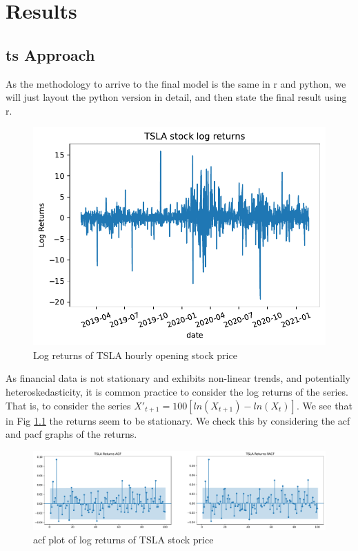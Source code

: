 \chapter{Results}
\label{chap:results}

\section{\acrlong{ts} Approach}
As the methodology to arrive to the final model is the same in \Gls{r} and \Gls{python}, we will just layout the \Gls{python} version in detail, and then state the final result using \Gls{r}.

\begin{figure}
	\centering
	\includegraphics[width=\textwidth]{img/img_returns.pdf}
	\caption{Log returns of TSLA hourly opening stock price}
	\label{fig:tsla_returns}
\end{figure}

As financial data is not stationary and exhibits non-linear trends, and potentially heteroskedasticity, it is common practice to consider the log returns of the series. That is, to consider the series $X'_{t+1} = 100[ln(X_{t+1})-ln(X_t)]$. We see that in Fig \ref{fig:tsla_returns} the returns seem to be stationary. We check this by considering the \acrshort{acf} and \acrshort{pacf} graphs of the returns.

\begin{figure}
	\centering
	\includegraphics[width=\textwidth]{img/img_acf_tsla.pdf}
	\caption{\acrshort{acf} plot of log returns of TSLA stock price}
	\label{fig:acf_returns}
\end{figure}

